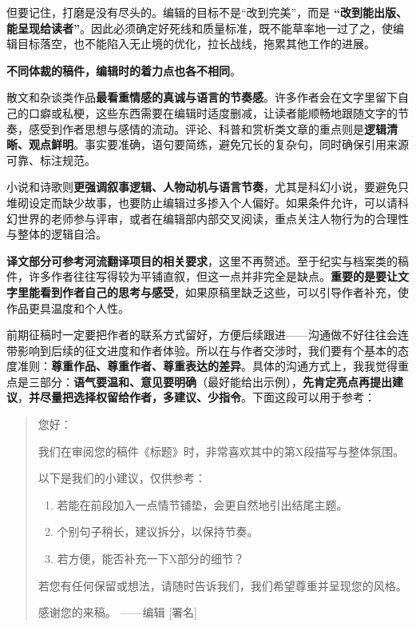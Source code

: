 但要记住，打磨是没有尽头的。编辑的目标不是``改到完美''，而是
\textbf{``改到能出版、能呈现给读者''}。因此必须确定好死线和质量标准，既不能草率地一过了之，使编辑目标落空，也不能陷入无止境的优化，拉长战线，拖累其他工作的进展。

\textbf{不同体裁的稿件，编辑时的着力点也各不相同}。

散文和杂谈类作品\textbf{最看重情感的真诚与语言的节奏感}。许多作者会在文字里留下自己的口癖或私梗，这些东西需要在编辑时适度删减，让读者能顺畅地跟随文字的节奏，感受到作者思想与感情的流动。评论、科普和赏析类文章的重点则是\textbf{逻辑清晰、观点鲜明}。事实要准确，语句要简练，避免冗长的复杂句，同时确保引用来源可靠、标注规范。

小说和诗歌则\textbf{更强调叙事逻辑、人物动机与语言节奏}，尤其是科幻小说，要避免只堆砌设定而缺少故事，也要防止编辑过多掺入个人偏好。如果条件允许，可以请科幻世界的老师参与评审，或者在编辑部内部交叉阅读，重点关注人物行为的合理性与整体的逻辑自洽。

\textbf{译文部分可参考河流翻译项目的相关要求}，这里不再赘述。至于纪实与档案类的稿件，许多作者往往写得较为平铺直叙，但这一点并非完全是缺点。\textbf{重要的是要让文字里能看到作者自己的思考与感受}，如果原稿里缺乏这些，可以引导作者补充，使作品更具温度和个人性。

前期征稿时一定要把作者的联系方式留好，方便后续跟进------沟通做不好往往会连带影响到后续的征文进度和作者体验。所以在与作者交涉时，我们要有个基本的态度准则：\textbf{尊重作品、尊重作者、尊重表达的差异}。具体的沟通方式上，我我觉得重点是三部分：\textbf{语气要温和、意见要明确}（最好能给出示例），\textbf{先肯定亮点再提出建议}，\textbf{并尽量把选择权留给作者，多建议、少指令}。下面这段可以用于参考：

\begin{quote}
您好：

我们在审阅您的稿件《标题》时，非常喜欢其中的第X段描写与整体氛围。

以下是我们的小建议，仅供参考：

\begin{enumerate}
\def\labelenumi{\arabic{enumi}.}
\tightlist
\item
  若能在前段加入一点情节铺垫，会更自然地引出结尾主题。
\item
  个别句子稍长，建议拆分，以保持节奏。
\item
  若方便，能否补充一下X部分的细节？
\end{enumerate}

若您有任何保留或想法，请随时告诉我们，我们希望尊重并呈现您的风格。

感谢您的来稿。 ------编辑 {[}署名{]}
\end{quote}

